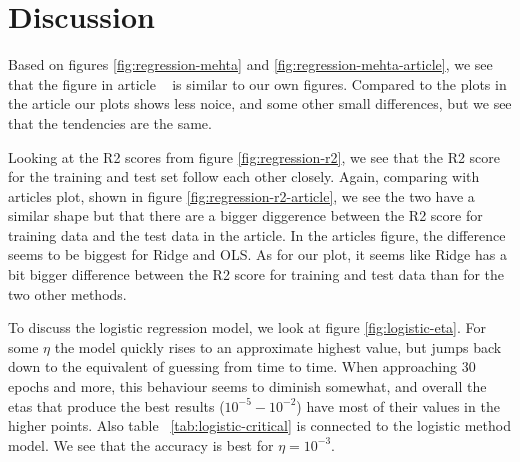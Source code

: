 \section{Discussion}
Based on figures \ref{fig:regression-mehta} and 
\ref{fig:regression-mehta-article}, we see that the figure in article 
~\cite{HighBias} is similar to our own figures. 
Compared to the plots in the article our plots shows less noice, 
and some other small differences, but we see that the tendencies are the same.

Looking at the R2 scores from figure \ref{fig:regression-r2}, we see 
that the R2 score for the training and test set follow each other closely. 
Again, comparing with articles plot, shown in figure 
\ref{fig:regression-r2-article}, we see the two have a similar shape 
but that there are a bigger diggerence between the R2 score for training 
data and the test data in the article. 
In the articles figure, the difference seems to be biggest for Ridge and 
OLS. As for our plot, it seems like Ridge has a bit bigger difference 
between the R2 score for training and test data than for the two other 
methods.

To discuss the logistic regression model, 
we look at figure \ref{fig:logistic-eta}. For some $\eta$ the model 
quickly rises to an approximate highest value, but jumps back down to 
the equivalent of guessing from time
to time. When approaching 30 epochs and more, this behaviour 
seems to diminish somewhat, and overall the etas that produce 
the best results ($10^{-5} - 10^{-2}$) have most of their values
in the higher points.
Also table ~\ref{tab:logistic-critical} is connected 
to the logistic method model. We see that the accuracy is best
for \(\eta = 10^{-3}\). 



